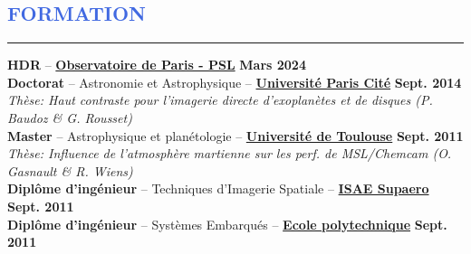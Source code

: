 \documentclass[11pt, a4paper, french]{article}
\begin{document}

\vspace{-0.43cm}
\textcolor{RoyalBlue}{\section{\large FORMATION}
\vspace{-0.2cm}\hrule}
\vspace{0.4cm}


{\bf HDR} -- \href{https://observatoiredeparis.psl.eu/}{\textbf{Observatoire de Paris - PSL}}
\hfill  { \bf Mars 2024}\\

\vspace{-0.2cm}
{\bf Doctorat} -- Astronomie et Astrophysique -- \href{https://u-paris.fr/}{\textbf{Université Paris Cité}} \hfill  {  \bf  Sept. 2014}\\
{\footnotesize
\it Thèse: Haut contraste pour l'imagerie directe d'exoplanètes et de disques (P. Baudoz \& G. Rousset)}\\

\vspace{-0.2cm}
{\bf Master} -- Astrophysique et planétologie --
\href{https://www5.obs-mip.fr/masterasep/}{\textbf{Université de Toulouse}}  \hfill  { \bf Sept. 2011}\\
{\footnotesize
\it Thèse: Influence de l'atmosphère martienne sur les perf. de MSL/Chemcam (O. Gasnault \& R. Wiens)} \hfill { \small \bf }\\

\vspace{-0.2cm}
{\bf Diplôme d'ingénieur} -- Techniques d'Imagerie Spatiale -- \href{https://www.isae-supaero.fr/isae-supaero-6/}{\textbf{\textbf{ISAE Supaero}}} \hfill { \bf Sept. 2011}\\


\vspace{-0.2cm}
{\bf Diplôme d'ingénieur} -- Systèmes Embarqués --
\href{https://www.polytechnique.edu/}{\textbf{\textbf{Ecole polytechnique}}}
\hfill \hfill { \bf Sept. 2011}  \\

\end{document}
